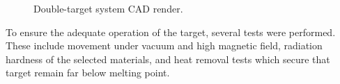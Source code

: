     \begin{figure}[b!]
        \centering{}
        \caption[Double-target system.]{Double-target system CAD render.}
        \label{fig::double_target}
    \end{figure}

    To ensure the adequate operation of the target, several tests were performed.
    These include movement under vacuum and high magnetic field, radiation hardness of the selected materials, and heat removal tests which secure that target remain far below melting point.

    
